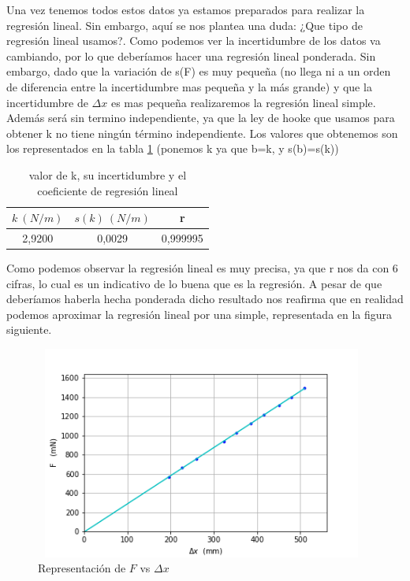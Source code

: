 \documentclass[12pt,a4paper]{book}
\begin{document}
Una vez tenemos todos estos datos ya estamos preparados para realizar la regresión lineal. Sin embargo, aquí se nos plantea una duda: ¿Que tipo de regresión lineal usamos?. Como podemos ver la incertidumbre de los datos va cambiando, por lo que deberíamos hacer una regresión lineal ponderada. Sin embargo, dado que la variación de s(F) es muy pequeña (no llega ni a un orden de diferencia entre la incertidumbre mas pequeña y la más grande) y que la incertidumbre de $\Delta x$ es mas pequeña realizaremos la regresión lineal simple. Además será sin termino independiente, ya que la ley de hooke que usamos para obtener k no tiene ningún término independiente. Los valores que obtenemos son los representados en la tabla \ref{Tab:muelle-valor de k, s(k) y r} (ponemos k ya que b=k, y s(b)=s(k)) \\

\begin{table}[h] %
\begin{center}
\begin{tabular}{|c|c|c|}
\hline
$k \ (N/m) $ & 	 $s(k) \ (N/m) $ & 	 r \\ \hline
2,9200 & 	 0,0029 & 	 0,999995 \\ 
\hline
\end{tabular}
\caption{valor de k, su incertidumbre y el coeficiente de regresión lineal}
\label{Tab:muelle-valor de k, s(k) y r}
\end{center}
\end{table}

Como podemos observar la regresión lineal es muy precisa, ya que r nos da con 6 cifras, lo cual es un indicativo de lo buena que es la regresión. A pesar de que deberíamos haberla hecha ponderada dicho resultado nos reafirma que en realidad podemos aproximar la regresión lineal por una simple, representada en la figura siguiente. 

\begin{figure}[h!] %
\centering
\includegraphics[width=11cm, height=7cm]{Plot1-muelle.png}
\caption{Representación de $F$ vs $\Delta x$ }
\label{fig:Plot1-muelle}
\end{figure}
\end{document}
